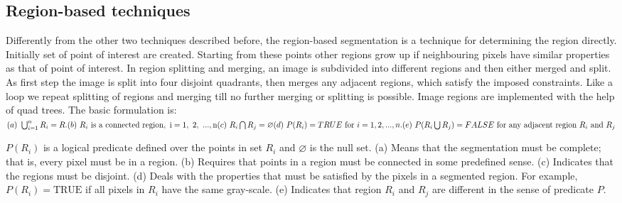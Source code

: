 \subsection{Region-based techniques}
Differently from the other two techniques described before, the region-based segmentation is a technique for determining the region directly. Initially set of point of interest are created. Starting from these points other regions grow up if neighbouring pixels have similar properties as that of point of interest. In region splitting and merging, an image is subdivided into different regions and then either merged and split. As first step the image is split into four disjoint quadrants, then merges any adjacent regions, which satisfy the imposed constraints. Like a loop we repeat splitting of regions and merging till no further merging or splitting is
possible. Image regions are implemented with the help of quad trees.
The basic formulation is:$\\
(a){\text{ }}\bigcup \nolimits _{{i=1}}^{{n}}{R_{{i}}=R.}\\
(b){\text{ }}R_{{i}}{\text{ is a connected region}},{\text{ i}}={\text{1}},{\text{ 2}},{\text{ }}...,{\text{n}}\\
(c){\text{ }}R_{{i}}\bigcap R_{{j}}=\varnothing\\
(d){\text{ }}P(R_{{i}})=TRUE{\text{ for }}i=1,2,...,n.\\
(e){\text{ }}P(R_{{i}}\bigcup R_{{j}})=FALSE{\text{ for any adjacent region }}R_{{i}}{\text{ and }}R_{{j}}\\
$

$P(R_{{i}})$ is a logical predicate defined over the points in set $R_{i}$ and $\varnothing$  is the null set.
(a) Means that the segmentation must be complete; that is, every pixel must be in a region.
(b) Requires that points in a region must be connected in some predefined sense.
(c) Indicates that the regions must be disjoint.
(d) Deals with the properties that must be satisfied by the pixels in a segmented region. For example, $P(R_{{i}})={\text{TRUE}}$ if all pixels in $R_{i}$ have the same gray-scale.
(e) Indicates that region $R_{i}$ and $R_{{j}}$ are different in the sense of predicate $P$.\cite{website:region_g}

